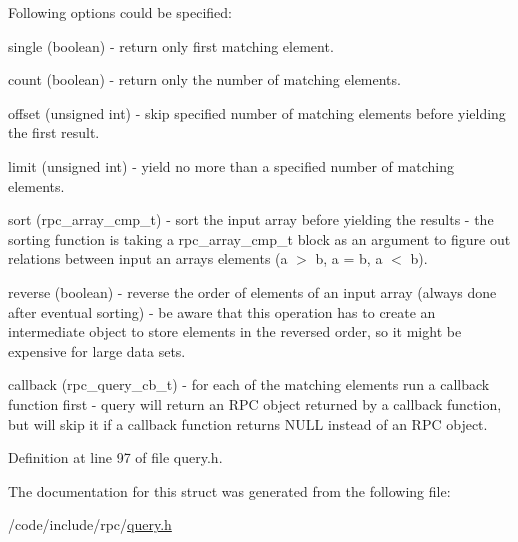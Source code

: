 Following options could be specified\+:
\begin{DoxyItemize}
\item single (boolean) -\/ return only first matching element.
\item count (boolean) -\/ return only the number of matching elements.
\item offset (unsigned int) -\/ skip specified number of matching elements before yielding the first result.
\item limit (unsigned int) -\/ yield no more than a specified number of matching elements.
\item sort (rpc\+\_\+array\+\_\+cmp\+\_\+t) -\/ sort the input array before yielding the results -\/ the sorting function is taking a rpc\+\_\+array\+\_\+cmp\+\_\+t block as an argument to figure out relations between input an array\textquotesingle{}s elements (a $>$ b, a = b, a $<$ b).
\item reverse (boolean) -\/ reverse the order of elements of an input array (always done after eventual sorting) -\/ be aware that this operation has to create an intermediate object to store elements in the reversed order, so it might be expensive for large data sets.
\item callback (rpc\+\_\+query\+\_\+cb\+\_\+t) -\/ for each of the matching elements run a callback function first -\/ query will return an R\+PC object returned by a callback function, but will skip it if a callback function returns N\+U\+LL instead of an R\+PC object. 
\end{DoxyItemize}

Definition at line 97 of file query.\+h.



The documentation for this struct was generated from the following file\+:\begin{DoxyCompactItemize}
\item 
/code/include/rpc/\hyperlink{query_8h}{query.\+h}\end{DoxyCompactItemize}
